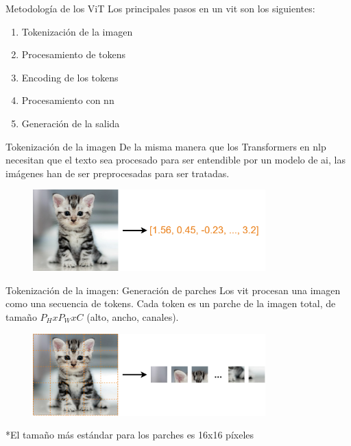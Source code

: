 \begin{frame}{Metodología de los ViT}
Los principales pasos en un \gls{vit} son los siguientes:
\begin{enumerate}
    \item Tokenización de la imagen
    \item Procesamiento de tokens
    \item Encoding de los tokens
    \item Procesamiento con \gls{nn}
    \item Generación de la salida
\end{enumerate}
\end{frame}

\begin{frame}{Tokenización de la imagen}
De la misma manera que los Transformers en \alert{\gls{nlp}} necesitan que el texto sea procesado para ser entendible por un modelo de \gls{ai}, las imágenes han de ser \alert{preprocesadas} para ser tratadas.

\begin{figure}
    \centering
    \includegraphics[width=0.8\textwidth]{figures/Vision_Transformers/Image_Preprocessing.png}
\end{figure}
\end{frame}

\begin{frame}{Tokenización de la imagen: Generación de parches}
Los \gls{vit} procesan una imagen como una \alert{secuencia de tokens}. Cada token es un \alert{parche} de la imagen total, de tamaño $P_HxP_WxC$ (alto, ancho, canales).

\begin{figure}
    \centering
    \includegraphics[width=0.8\textwidth]{figures/Vision_Transformers/Image_Tiling.png}
\end{figure}

*El tamaño más estándar para los parches es 16x16 píxeles
\end{frame}

